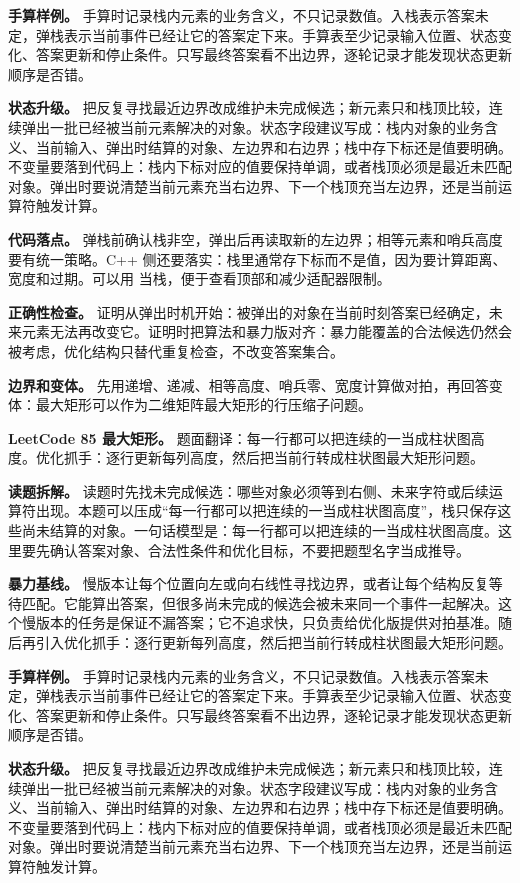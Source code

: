 \textbf{手算样例。} 手算时记录栈内元素的业务含义，不只记录数值。入栈表示答案未定，弹栈表示当前事件已经让它的答案定下来。手算表至少记录输入位置、状态变化、答案更新和停止条件。只写最终答案看不出边界，逐轮记录才能发现状态更新顺序是否错。

\textbf{状态升级。} 把反复寻找最近边界改成维护未完成候选；新元素只和栈顶比较，连续弹出一批已经被当前元素解决的对象。状态字段建议写成：栈内对象的业务含义、当前输入、弹出时结算的对象、左边界和右边界；栈中存下标还是值要明确。不变量要落到代码上：栈内下标对应的值要保持单调，或者栈顶必须是最近未匹配对象。弹出时要说清楚当前元素充当右边界、下一个栈顶充当左边界，还是当前运算符触发计算。

\textbf{代码落点。} 弹栈前确认栈非空，弹出后再读取新的左边界；相等元素和哨兵高度要有统一策略。C++ 侧还要落实：栈里通常存下标而不是值，因为要计算距离、宽度和过期。可以用  当栈，便于查看顶部和减少适配器限制。

\textbf{正确性检查。} 证明从弹出时机开始：被弹出的对象在当前时刻答案已经确定，未来元素无法再改变它。证明时把算法和暴力版对齐：暴力能覆盖的合法候选仍然会被考虑，优化结构只替代重复检查，不改变答案集合。

\textbf{边界和变体。} 先用递增、递减、相等高度、哨兵零、宽度计算做对拍，再回答变体：最大矩形可以作为二维矩阵最大矩形的行压缩子问题。

\noindent\textbf{LeetCode 85 最大矩形。} 题面翻译：每一行都可以把连续的一当成柱状图高度。优化抓手：逐行更新每列高度，然后把当前行转成柱状图最大矩形问题。

\textbf{读题拆解。} 读题时先找未完成候选：哪些对象必须等到右侧、未来字符或后续运算符出现。本题可以压成“每一行都可以把连续的一当成柱状图高度”，栈只保存这些尚未结算的对象。一句话模型是：每一行都可以把连续的一当成柱状图高度。这里要先确认答案对象、合法性条件和优化目标，不要把题型名字当成推导。

\textbf{暴力基线。} 慢版本让每个位置向左或向右线性寻找边界，或者让每个结构反复等待匹配。它能算出答案，但很多尚未完成的候选会被未来同一个事件一起解决。这个慢版本的任务是保证不漏答案；它不追求快，只负责给优化版提供对拍基准。随后再引入优化抓手：逐行更新每列高度，然后把当前行转成柱状图最大矩形问题。

\textbf{手算样例。} 手算时记录栈内元素的业务含义，不只记录数值。入栈表示答案未定，弹栈表示当前事件已经让它的答案定下来。手算表至少记录输入位置、状态变化、答案更新和停止条件。只写最终答案看不出边界，逐轮记录才能发现状态更新顺序是否错。

\textbf{状态升级。} 把反复寻找最近边界改成维护未完成候选；新元素只和栈顶比较，连续弹出一批已经被当前元素解决的对象。状态字段建议写成：栈内对象的业务含义、当前输入、弹出时结算的对象、左边界和右边界；栈中存下标还是值要明确。不变量要落到代码上：栈内下标对应的值要保持单调，或者栈顶必须是最近未匹配对象。弹出时要说清楚当前元素充当右边界、下一个栈顶充当左边界，还是当前运算符触发计算。


